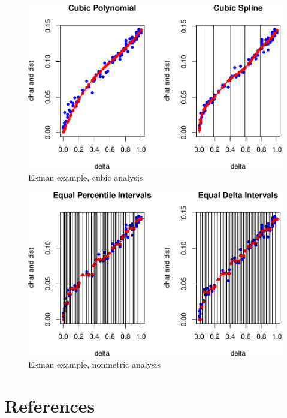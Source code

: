 \documentclass[
  12pt,
]{article}
\begin{document}
\begin{figure}

{\centering \includegraphics{smacofManual_files/figure-latex/ekmancubic-1} 

}

\caption{Ekman example, cubic analysis}\label{fig:ekmancubic}
\end{figure}

\begin{figure}

{\centering \includegraphics{smacofManual_files/figure-latex/ekmanordinal-1} 

}

\caption{Ekman example, nonmetric analysis}\label{fig:ekmanordinal}
\end{figure}

\section*{References}\label{references}
\end{document}
